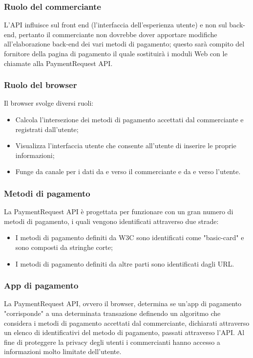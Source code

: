 \documentclass[italian]{article}
\begin{document}
	\subsubsection{Ruolo del commerciante}
	L'API influisce sul front end (l'interfaccia dell'esperienza utente) e non sul back-end, pertanto il commerciante non dovrebbe dover apportare modifiche all'elaborazione back-end dei vari metodi di pagamento; questo sarà compito del fornitore della pagina di pagamento il quale sostituirà i moduli Web con le chiamate alla PaymentRequest API.
	
	\subsubsection{Ruolo del browser}
	Il browser svolge diversi ruoli:
	\begin{itemize}
	\item Calcola l'intersezione dei metodi di pagamento accettati dal commerciante e registrati dall'utente;
	\item Visualizza l'interfaccia utente che consente all'utente di inserire le proprie informazioni;
	\item Funge da canale per i dati da e verso il commerciante e da e verso l'utente.
	\end{itemize}
	
	\subsubsection{Metodi di pagamento}
	La PaymentRequest API è progettata per funzionare con un gran numero di metodi di pagamento, i quali vengono identificati attraverso due strade:
	\begin{itemize}
		\item I metodi di pagamento definiti da W3C sono identificati come "basic-card" e sono composti da stringhe corte;
		\item I metodi di pagamento definiti da altre parti sono identificati dagli URL.
	\end{itemize}
	
	\subsubsection{App di pagamento}
	La PaymentRequest API, ovvero il browser, determina se un'app di pagamento "corrisponde" a una determinata transazione definendo un algoritmo che considera i metodi di pagamento accettati dal commerciante, dichiarati attraverso un elenco di identificativi del metodo di pagamento, passati attraverso l'API.
	Al fine di proteggere la privacy degli utenti i commercianti hanno accesso a informazioni molto limitate dell'utente. 
	
\end{document}
